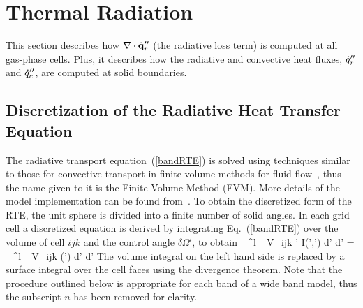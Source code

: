 \documentclass[11pt]{book}
\begin{document}
\clearpage
\section{Thermal Radiation}
\label{radnumericalmethodsection}

This section describes how $\nabla \cdot \dot{\bf q}_r''$ (the radiative loss term) is computed at all gas-phase cells. Plus, it describes how
the radiative and convective heat fluxes, $\dot{q}_r''$ and $\dot{q}_c''$, are computed at solid boundaries.

\subsection{Discretization of the Radiative Heat Transfer Equation}

The radiative transport equation~(\ref{bandRTE}) is solved using
techniques similar to those for convective transport in finite volume
methods for fluid flow~\cite{Raithby}, thus the name given to it is
the Finite Volume Method (FVM). More details of the model
implementation can be found from~\cite{Hostikka:2008}.
To obtain the discretized form of the
RTE, the unit sphere is divided into a finite number of solid angles.
In each grid cell a discretized equation is derived by integrating
Eq.~(\ref{bandRTE}) over the volume of cell $ijk$ and the control
angle $\delta \Omega^l$, to obtain
\be
  \int_{\delta \Omega^l} \int_{V_{ijk}}
   \bs' \cdot \nabla I(\bx',\bs') d\bx' d\bs' =
   \int_{\delta \Omega^l} \int_{V_{ijk}} \kappa(\bx') \;
    \left[ I_{b}(\bx') - I(\bx',\bs') \right] d\bx' d\bs'
\ee
The volume integral on the left hand side is replaced by a surface
integral over the cell faces using the divergence theorem. Note that
the procedure outlined below is appropriate for each band of a wide
band model, thus the subscript $n$ has been removed for clarity.
\end{document}
